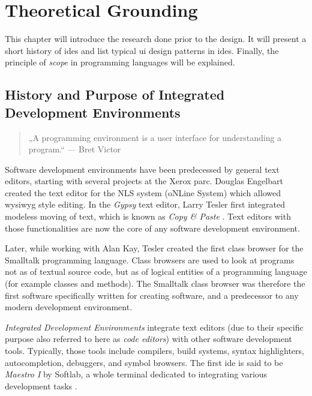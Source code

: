 \chapter{Theoretical Grounding}\label{research}

This chapter will introduce the research done prior to the design. It
will present a short history of \glspl{ide} and list typical \gls{ui}
design patterns in \glspl{ide}. Finally, the principle of \emph{scope}
in programming languages will be explained.

\section{History and Purpose of Integrated Development
Environments}\label{history-and-purpose-of-integrated-development-environments}

\begin{quote}
„A programming environment is a user interface for understanding a
program.“ — Bret Victor \citeyear{victor}
\end{quote}

Software development environments have been predecessed by general text
editors, starting with several projects at the Xerox \gls{parc}. Douglas
Engelbart created the text editor for the NLS system (oNLine System)
which allowed \gls{wysiwyg} style editing. In the \emph{Gypsy} text
editor, Larry Tesler first integrated modeless moving of text, which is
known as \emph{Copy \& Paste} \cite{moggridge}. Text editors with those
functionalities are now the core of any software development
environment.

Later, while working with Alan Kay, Tesler created the first class
browser for the Smalltalk programming language. Class browsers are used
to look at programs not as of textual source code, but as of logical
entities of a programming language (for example classes and methods).
The Smalltalk class browser was therefore the first software
specifically written for creating software, and a predecessor to any
modern development environment.

\emph{Integrated Development Environments} integrate text editors (due
to their specific purpose also referred to here as \emph{code editors})
with other software development tools. Typically, those tools include
compilers, build systems, syntax highlighters, autocompletion,
debuggers, and symbol browsers. The first \ac{ide} is said to be
\emph{Maestro I} by Softlab, a whole terminal dedicated to integrating
various development tasks \cite{maestro}.

